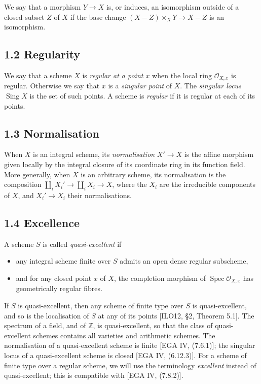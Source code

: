 \documentclass[11pt]{article}
\newcommand{\OO}{\mathcal O}
\newcommand{\Sing}{\operatorname{Sing}}
\newcommand{\Spec}{\operatorname{Spec}}
\begin{document}
We say that a morphism $Y\to X$ is, or induces, an isomorphism outside of a closed subset $Z$ of $X$ if the base change $(X-Z)\times_XY\to X-Z$ is an isomorphism.

\subsection*{1.2 Regularity}
We say that a scheme $X$ is \emph{regular at a point $x$} when the local ring $\OO_{X,x}$ is regular. Otherwise we say that $x$ is a \emph{singular point} of $X$. The \emph{singular locus} $\Sing X$ is the set of such points. A scheme is \emph{regular} if it is regular at each of its points.

\subsection*{1.3 Normalisation}
When $X$ is an integral scheme, its \emph{normalisation} $X'\to X$ is the affine morphism given locally by the integral closure of its coordinate ring in its function field. More generally, when $X$ is an arbitrary scheme, its normalisation is the composition $\coprod_iX_i'\to\coprod_iX_i\to X$, where the $X_i$ are the irreducible components of $X$, and $X_i'\to X_i$ their normalisations.

\subsection*{1.4 Excellence}
A scheme $S$ is called \emph{quasi-excellent} if
\begin{itemize}
\item any integral scheme finite over $S$ admits an open dense regular subscheme,
\item and for any closed point $x$ of $X$, the completion morphism of $\Spec\OO_{X,x}$ has geometrically regular fibres.
\end{itemize}
If $S$ is quasi-excellent, then any scheme of finite type over $S$ is quasi-excellent, and so is the localisation of $S$ at any of its points [ILO12, \S2, Theorem 5.1]. The spectrum of a field, and of $\mathbb Z$, is quasi-excellent, so that the class of quasi-excellent schemes contains all varieties and arithmetic schemes. The normalisation of a quasi-excellent scheme is finite [EGA IV, (7.6.1)]; the singular locus of a quasi-excellent scheme is closed [EGA IV, (6.12.3)]. For a scheme of finite type over a regular scheme, we will use the terminology \emph{excellent} instead of quasi-excellent; this is compatible with [EGA IV, (7.8.2)].
\end{document}
